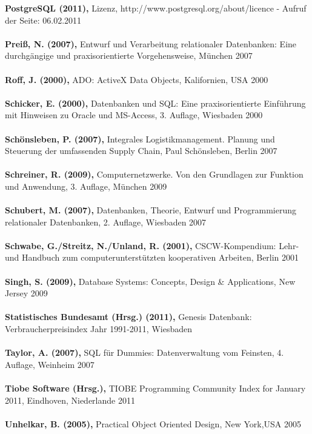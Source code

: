 \textbf{PostgreSQL (2011),} Lizenz, http://www.postgresql.org/about/licence - Aufruf der Seite: 06.02.2011\\\\
\textbf{Preiß, N. (2007),} Entwurf und Verarbeitung relationaler Datenbanken: Eine durchgängige und praxisorientierte Vorgehensweise, München 2007\\\\
\textbf{Roff, J. (2000),} ADO: ActiveX Data Objects, Kalifornien, USA 2000\\\\
\textbf{Schicker, E. (2000),} Datenbanken und SQL: Eine praxisorientierte Einführung mit Hinweisen zu Oracle und MS-Access, 3. Auflage, Wiesbaden 2000\\\\
\textbf{Schönsleben, P. (2007),} Integrales Logistikmanagement. Planung und Steuerung der umfassenden Supply Chain, Paul Schönsleben, Berlin 2007\\\\
\textbf{Schreiner, R. (2009),} Computernetzwerke. Von den Grundlagen zur Funktion und Anwendung, 3. Auflage, München 2009\\\\
\textbf{Schubert, M. (2007),} Datenbanken, Theorie, Entwurf und Programmierung relationaler Datenbanken, 2. Auflage, Wiesbaden 2007\\\\
\textbf{Schwabe, G./Streitz, N./Unland, R. (2001),} CSCW-Kompendium: Lehr- und Handbuch zum computerunterstützten kooperativen Arbeiten, Berlin 2001\\\\
\textbf{Singh, S. (2009),} Database Systems: Concepts, Design \& Applications, New Jersey 2009\\\\
\textbf{Statistisches Bundesamt (Hrsg.) (2011),} Genesis Datenbank: Verbraucherpreisindex Jahr 1991-2011, Wiesbaden\\\\
\textbf{Taylor, A. (2007),} SQL für Dummies: Datenverwaltung vom Feinsten, 4. Auflage, Weinheim 2007\\\\
\textbf{Tiobe Software (Hrsg.),} TIOBE Programming Community Index for January 2011, Eindhoven, Niederlande 2011\\\\
\textbf{Unhelkar, B. (2005),} Practical Object Oriented Design, New York,USA 2005\\\\
